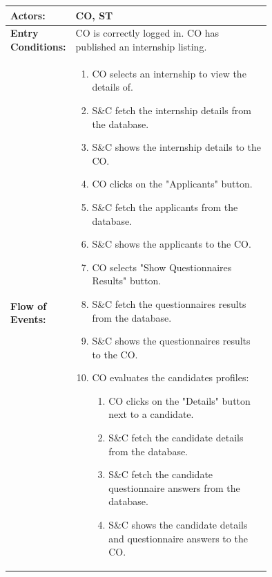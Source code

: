 \begin{center}
    \begin{longtable}{|l|p{0.75\linewidth}|}
        \hline
        \textbf{Actors:}           & CO, ST                                                                                  \\
        \hline
        \textbf{Entry Conditions:} & CO is correctly logged in. CO has published an internship listing.                      \\
        \hline
        \textbf{Flow of Events:}   & \begin{enumerate}
                                         \item CO selects an internship to view the details of.
                                         \item S\&C fetch the internship details from the database.
                                         \item S\&C shows the internship details to the CO.
                                         \item CO clicks on the "Applicants" button.
                                         \item S\&C fetch the applicants from the database.
                                         \item S\&C shows the applicants to the CO.
                                         \item CO selects "Show Questionnaires Results" button.
                                         \item S\&C fetch the questionnaires results from the database.
                                         \item S\&C shows the questionnaires results to the CO.
                                         \item CO evaluates the candidates profiles:
                                               \begin{enumerate}
                      \item CO clicks on the "Details" button next to a candidate.
                      \item S\&C fetch the candidate details from the database.
                      \item S\&C fetch the candidate questionnaire answers from the database.
                      \item S\&C shows the candidate details and questionnaire answers to the CO.
                  \end{enumerate}

\end{enumerate}
\end{longtable}
\end{center}

